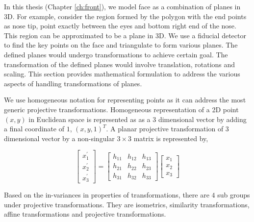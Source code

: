 
In this thesis (Chapter \ref{ch:front}), we model face as a combination of planes in 3D. For example, consider the region
formed by the polygon with the end points as nose tip, point exactly between the eyes and bottom right
end of the nose. This region can be approximated to be a plane in 3D. We use a fiducial detector to 
find the key points on the face and triangulate to form various planes. The defined planes would undergo
transformations to achieve certain goal. The transformation of the defined planes would involve translation, 
rotations and scaling. This section provides mathematical formulation to address the various aspects of 
handling transformations of planes.

We use homogeneous notation for representing points as it can address the most generic projective 
transformations. Homogeneous representation of a 2D point $(x, y)$ in Euclidean space is represented as 
as a $3$ dimensional vector by adding a final coordinate of $1$, $(x, y, 1)^T$. A planar projective 
transformation of $3$ dimensional vector by a non-singular $3 \times 3$ matrix is represented by,

\[
\begin{bmatrix}
x_1^{\prime} \\
x_2^{\prime} \\
x_3^{\prime} 
\end{bmatrix}
=
\begin{bmatrix}
h_{11} & h_{12} & h_{13} \\
h_{21} & h_{22} & h_{23} \\
h_{31} & h_{32} & h_{33} 
\end{bmatrix}
\begin{bmatrix}
x_1 \\
x_2 \\
x_3 
\end{bmatrix}
\label{eqn:homogenous}
\]

Based on the in-variances in properties of transformations, there are $4$ sub groups under projective 
transformations. They are isometrics, similarity transformations, affine transformations and projective
transformations. 

